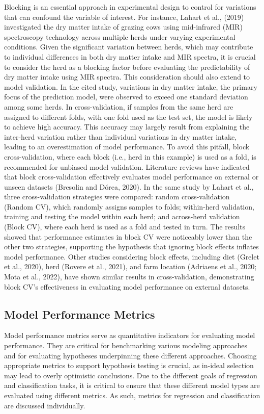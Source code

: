 Blocking is an essential approach in experimental design to control for variations that can confound the variable of interest. For instance, Lahart et al., (2019) investigated the dry matter intake of grazing cows using mid-infrared (MIR) spectroscopy technology across multiple herds under varying experimental conditions. Given the significant variation between herds, which may contribute to individual differences in both dry matter intake and MIR spectra, it is crucial to consider the herd as a blocking factor before evaluating the predictability of dry matter intake using MIR spectra. This consideration should also extend to model validation. In the cited study, variations in dry matter intake, the primary focus of the prediction model, were observed to exceed one standard deviation among some herds. In cross-validation, if samples from the same herd are assigned to different folds, with one fold used as the test set, the model is likely to achieve high accuracy. This accuracy may largely result from explaining the inter-herd variation rather than individual variations in dry matter intake, leading to an overestimation of model performance. To avoid this pitfall, block cross-validation, where each block (i.e., herd in this example) is used as a fold, is recommended for unbiased model validation.
Literature reviews have indicated that block cross-validation effectively evaluates model performance on external or unseen datasets (Bresolin and Dórea, 2020). In the same study by Lahart et al., three cross-validation strategies were compared: random cross-validation (Random CV), which randomly assigns samples to folds; within-herd validation, training and testing the model within each herd; and across-herd validation (Block CV), where each herd is used as a fold and tested in turn. The results showed that performance estimates in block CV were noticeably lower than the other two strategies, supporting the hypothesis that ignoring block effects inflates model performance. Other studies considering block effects, including diet (Grelet et al., 2020), herd (Rovere et al., 2021), and farm location (Adriaens et al., 2020; Mota et al., 2022), have shown similar results in cross-validation, demonstrating block CV's effectiveness in evaluating model performance on external datasets.

\subsection{Model Performance Metrics}

Model performance metrics serve as quantitative indicators for evaluating model performance. They are critical for benchmarking various modeling approaches and for evaluating hypotheses underpinning these different approaches. Choosing appropriate metrics to support hypothesis testing is crucial, as in-ideal selection may lead to overly optimistic conclusions. Due to the different goals of regression and classification tasks, it is critical to ensure that these different model types are evaluated using different metrics. As such, metrics for regression and classification are discussed individually.

